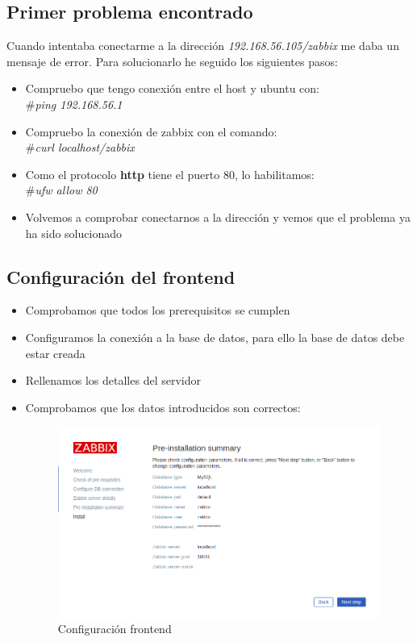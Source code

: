 \subsection{Primer problema encontrado}
Cuando intentaba conectarme a la dirección \textit{192.168.56.105/zabbix} me daba un mensaje de error. Para solucionarlo he seguido los siguientes pasos:

\begin{itemize}
	\item Compruebo que tengo conexión entre el host y ubuntu con:\\ \#\textit{ping 192.168.56.1}
	\item Compruebo la conexión de zabbix con el comando: \\ \#\textit{curl localhost/zabbix}
	\item Como el protocolo \textbf{http} tiene el puerto 80, lo habilitamos: \\ \#\textit{ufw allow 80}
	\item Volvemos a comprobar conectarnos a la dirección y vemos que el problema ya ha sido solucionado
\end{itemize}


\newpage
\subsection{Configuración del frontend}

\begin{itemize}
	\item Comprobamos que todos los prerequisitos se cumplen
	\item Configuramos la conexión a la base de datos, para ello la base de datos debe estar creada
	\item Rellenamos los detalles del servidor
	\item Comprobamos que los datos introducidos son correctos:
	
	 \begin{figure}[h]
	 	\centering
	 	\includegraphics[scale=0.5]{images/summary.png}
	 	\caption{Configuración frontend}
	 \end{figure}
	
\end{itemize}

